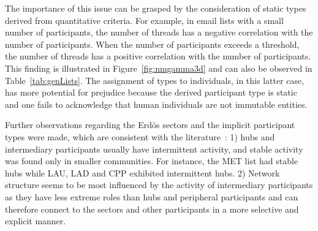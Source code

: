 \documentclass[%
	aip,
	jmp,%
	amsmath,amssymb,
	reprint,%
]{revtex4-1}
\begin{document}
																																																																																					The importance of this issue can be grasped by the consideration of static types derived from quantitative criteria. For example, in email lists with a small number of participants, the number of threads has a negative correlation with the number of participants.
																																																																																					When the number of participants exceeds a threshold, the number of threads has a positive correlation with the number of participants.
																																																																																					This finding is illustrated in Figure~\ref{fig:nmgamma3d}
																																																																																					and can also be observed in Table~\ref{tab:genLists}.
																																																																																					The assignment of types to individuals, in this latter case,
																																																																																					has more potential for prejudice because
																																																																																					the derived participant type is static and
																																																																																					one fails to acknowledge that
																																																																																					human individuals are not immutable entities.

																																																																																					Further observations regarding the Erd\"os sectors
																																																																																					and the implicit participant types were made, which are consistent with the literature~\cite{barabasiEvo}: 1) hubs and intermediary participants usually have intermittent activity, and stable activity was found only in smaller communities. For instance, the MET list had stable hubs while LAU, LAD and CPP exhibited intermittent hubs.
																																																																																					2) Network structure seems to be most influenced by the
																																																																																					activity of intermediary participants as they have less extreme
																																																																																					roles than hubs and peripheral participants and
																																																																																					can therefore connect to the sectors and other participants 
																																																																																					in a more selective and explicit manner.
\end{document}
